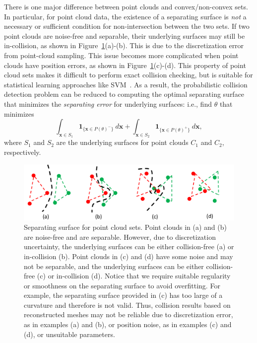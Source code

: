 There is one major difference between point clouds and convex/non-convex sets. In particular, for point cloud data, the existence of a separating surface is \emph{not} a necessary or sufficient condition for non-intersection between the two sets. If two point clouds are noise-free and separable, their underlying surfaces may still be in-collision, as shown in Figure~\ref{fig:7:separating-point}(a)-(b). This is due to the discretization error from point-cloud sampling. This issue becomes more complicated when point clouds have position errors, as shown in Figure~\ref{fig:7:separating-point}(c)-(d).
This property of point cloud sets makes it difficult to perform exact collision checking, but is suitable for statistical learning approaches like SVM~\cite{Bi:2005}. As a result, the probabilistic collision detection problem can be reduced to computing the optimal separating surface that minimizes the \emph{separating error}
for underlying surfaces: i.e., find $\theta$ that minimizes
\begin{equation}
\label{eq:7:error}
\int_{\mathbf x \in S_1} \mathbf{1}_{\{\mathbf x \in P(\theta)^-\}} \ d\mathbf x + \int_{\mathbf x \in S_2} \mathbf{1}_{\{\mathbf x \in P(\theta)^+\}} \ d\mathbf x,
\end{equation}
where $S_1$ and $S_2$ are the underlying surfaces for point clouds $C_1$ and $C_2$, respectively.


\begin{figure}[!htb]
  \centering
  \includegraphics[width=0.9\linewidth]{figs/7/separating-point.pdf}
  \caption[Separating surface for point cloud sets]{\label{fig:7:separating-point} Separating surface for point cloud sets. Point clouds in (a) and (b) are noise-free and are separable. However, due to discretization uncertainty, the underlying surfaces can be either
  collision-free (a) or in-collision (b). Point clouds in (c) and (d) have some noise and may not be separable, and the underlying surfaces can be either collision-free (c) or in-collision (d). Notice that we require suitable regularity or smoothness on the separating surface to avoid overfitting. For example, the separating surface provided in (c) has too large of a curvature and therefore is not valid. Thus, collision results based on reconstructed meshes may not be reliable due to discretization error, as in examples (a) and (b), or position noise, as in examples (c) and (d), or unsuitable parameters.}
\end{figure}


